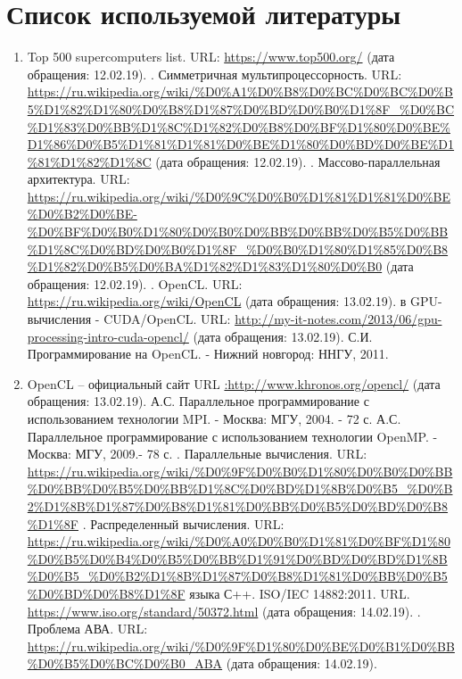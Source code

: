 { %
	\section*{Список используемой литературы}
	\begin{enumerate}
		\sloppy
		 В.В., Балакшин П.В. Введение в параллельные вычисления. – СПб: Университет ИТМО, 2016. – 51 с.
		\item Top 500 supercomputers list. URL: \url{https://www.top500.org/} (дата обращения: 12.02.19).
		. Симметричная мультипроцессорность. URL: \url{https://ru.wikipedia.org/wiki/%D0%A1%D0%B8%D0%BC%D0%BC%D0%B5%D1%82%D1%80%D0%B8%D1%87%D0%BD%D0%B0%D1%8F_%D0%BC%D1%83%D0%BB%D1%8C%D1%82%D0%B8%D0%BF%D1%80%D0%BE%D1%86%D0%B5%D1%81%D1%81%D0%BE%D1%80%D0%BD%D0%BE%D1%81%D1%82%D1%8C} (дата обращения: 12.02.19).
		. Массово-параллельная архитектура. URL: \url{https://ru.wikipedia.org/wiki/%D0%9C%D0%B0%D1%81%D1%81%D0%BE%D0%B2%D0%BE-%D0%BF%D0%B0%D1%80%D0%B0%D0%BB%D0%BB%D0%B5%D0%BB%D1%8C%D0%BD%D0%B0%D1%8F_%D0%B0%D1%80%D1%85%D0%B8%D1%82%D0%B5%D0%BA%D1%82%D1%83%D1%80%D0%B0} (дата обращения: 12.02.19).
		. OpenCL. URL: \url{https://ru.wikipedia.org/wiki/OpenCL} (дата обращения: 13.02.19).
		 в GPU-вычисления - CUDA/OpenCL. URL: \url{http://my-it-notes.com/2013/06/gpu-processing-intro-cuda-opencl/} (дата обращения: 13.02.19).
		 С.И. Программирование на OpenCL. - Нижний новгород: ННГУ, 2011.
		\item OpenCL – официальный сайт URL \url{:http://www.khronos.org/opencl/} (дата обращения: 13.02.19).
		 А.С. Параллельное программирование с использованием технологии MPI. - Москва: МГУ, 2004. - 72 с.
		 А.С. Параллельное программирование с использованием технологии OpenMP. - Москва: МГУ, 2009.- 78 с.
		. Параллельные вычисления. URL: \url{https://ru.wikipedia.org/wiki/%D0%9F%D0%B0%D1%80%D0%B0%D0%BB%D0%BB%D0%B5%D0%BB%D1%8C%D0%BD%D1%8B%D0%B5_%D0%B2%D1%8B%D1%87%D0%B8%D1%81%D0%BB%D0%B5%D0%BD%D0%B8%D1%8F}
		. Распределенный вычисления. URL: \url{https://ru.wikipedia.org/wiki/%D0%A0%D0%B0%D1%81%D0%BF%D1%80%D0%B5%D0%B4%D0%B5%D0%BB%D1%91%D0%BD%D0%BD%D1%8B%D0%B5_%D0%B2%D1%8B%D1%87%D0%B8%D1%81%D0%BB%D0%B5%D0%BD%D0%B8%D1%8F}
		 языка С++. ISO/IEC 14882:2011. URL. \url{https://www.iso.org/standard/50372.html} (дата обращения: 14.02.19).
		. Проблема АВА. URL: \url{https://ru.wikipedia.org/wiki/%D0%9F%D1%80%D0%BE%D0%B1%D0%BB%D0%B5%D0%BC%D0%B0_ABA} (дата обращения: 14.02.19).

\end{enumerate}}
